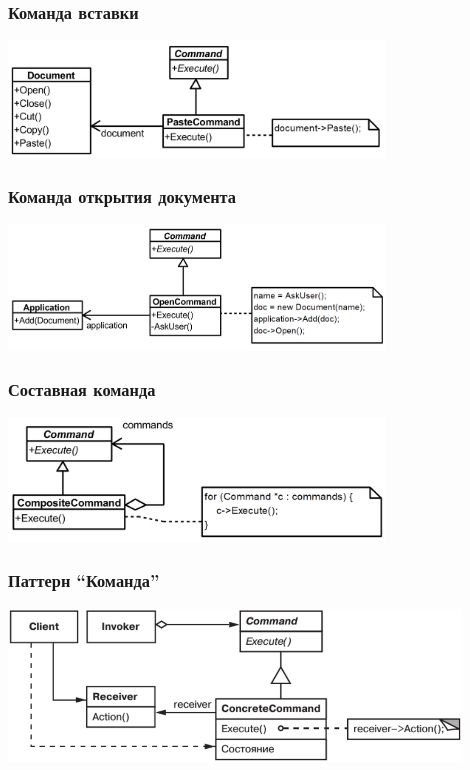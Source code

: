 \documentclass{../../slides-style}
\begin{document}
    \begin{frame}
        \frametitle{Команда вставки}
        \begin{center}
            \includegraphics[width=0.75\textwidth]{pasteCommand.png}
        \end{center}
    \end{frame}

    \begin{frame}
        \frametitle{Команда открытия документа}
        \begin{center}
            \includegraphics[width=0.75\textwidth]{openDocumentCommand.png}
        \end{center}
    \end{frame}

    \begin{frame}
        \frametitle{Составная команда}
        \begin{center}
            \includegraphics[width=0.75\textwidth]{compositeCommand.png}
        \end{center}
    \end{frame}

    \begin{frame}
        \frametitle{Паттерн ``Команда''}
        \begin{center}
            \includegraphics[width=0.9\textwidth]{command.png}
        \end{center}
    \end{frame}
\end{document}
